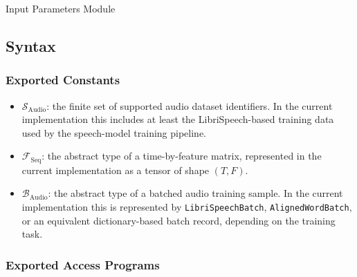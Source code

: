 \documentclass[12pt, titlepage]{article}
\begin{document}
Input Parameters Module

\subsection{Syntax}

\subsubsection{Exported Constants}

\begin{itemize}
\item $\mathcal{S}_{\mathrm{Audio}}$: the finite set of supported audio dataset identifiers. In the current implementation this includes at least the LibriSpeech-based training data used by the speech-model training pipeline.

\item $\mathcal{F}_{\mathrm{Seq}}$: the abstract type of a time-by-feature
matrix, represented in the current implementation as a tensor of shape
$(T, F)$.

\item $\mathcal{B}_{\mathrm{Audio}}$: the abstract type of a batched audio
training sample. In the current implementation this is represented by
\texttt{LibriSpeechBatch}, \texttt{AlignedWordBatch}, or an equivalent
dictionary-based batch record, depending on the training task.
\end{itemize}

\subsubsection{Exported Access Programs}
\end{document}
